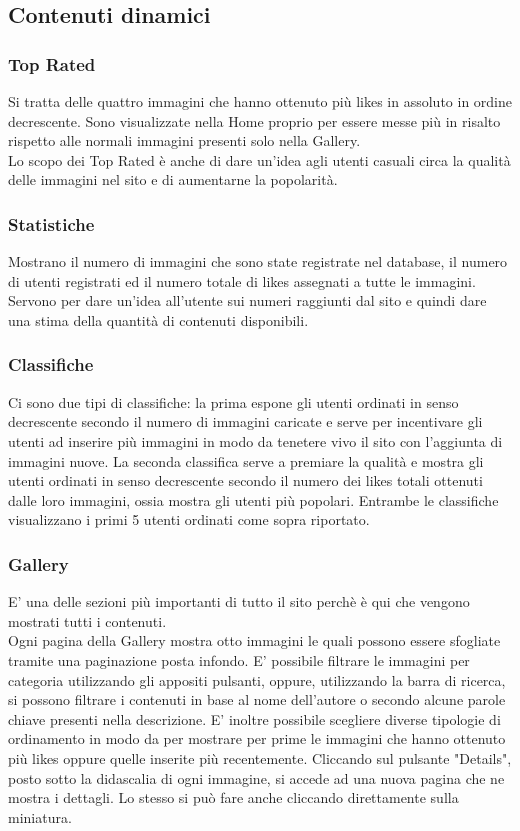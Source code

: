 \documentclass[openany, a4paper, 12pt]{report}
\begin{document}
	\subsection{Contenuti dinamici}
		\subsubsection{Top Rated}
		Si tratta delle quattro immagini che hanno ottenuto più likes in assoluto in ordine decrescente. Sono visualizzate nella Home proprio per essere messe più in risalto rispetto alle normali immagini presenti solo nella Gallery.\\
		Lo scopo dei Top Rated è anche di dare un'idea agli utenti casuali circa la qualità delle immagini nel sito e di aumentarne la popolarità.

		\subsubsection{Statistiche}
		Mostrano il numero di immagini che sono state registrate nel database, il numero di utenti registrati ed il numero totale di likes assegnati a tutte le immagini. Servono per dare un'idea all'utente sui numeri raggiunti dal sito e quindi dare una stima della quantità di contenuti disponibili.

		\subsubsection{Classifiche}
		Ci sono due tipi di classifiche: la prima espone gli utenti ordinati in senso decrescente secondo il numero di immagini caricate e serve per incentivare gli utenti ad inserire più immagini in modo da tenetere vivo il sito con l'aggiunta di immagini nuove. La seconda classifica serve a premiare la qualità e mostra gli utenti ordinati in senso decrescente secondo il numero dei likes totali ottenuti dalle loro immagini, ossia mostra gli utenti più popolari. Entrambe le classifiche visualizzano i primi 5 utenti ordinati come sopra riportato.
		
		\subsubsection{Gallery}
		E' una delle sezioni più importanti di tutto il sito perchè è qui che vengono mostrati tutti i contenuti.\\
		Ogni pagina della Gallery mostra otto immagini le quali possono essere sfogliate tramite una paginazione posta infondo. E' possibile filtrare le immagini per categoria utilizzando gli appositi pulsanti, oppure, utilizzando la barra di ricerca, si possono filtrare i contenuti in base al nome dell'autore o secondo alcune parole chiave presenti nella descrizione. E' inoltre possibile scegliere diverse tipologie di ordinamento in modo da per mostrare per prime le immagini che hanno ottenuto più likes oppure quelle inserite più recentemente. Cliccando sul pulsante "Details", posto sotto la didascalia di ogni immagine, si accede ad una nuova pagina che ne mostra i dettagli. Lo stesso si può fare anche cliccando direttamente sulla miniatura.
		
\end{document}
